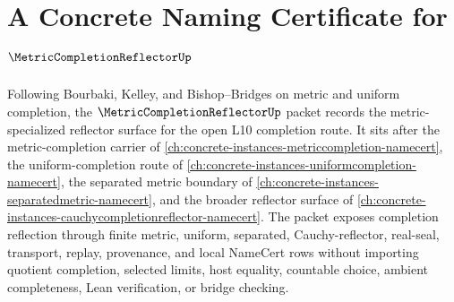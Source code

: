 \chapter{A Concrete Naming Certificate for $\MetricCompletionReflectorUp$}
\label{ch:concrete-instances-metric-completion-reflector-namecert}

Following Bourbaki, Kelley, and Bishop--Bridges on metric and uniform completion, the $\MetricCompletionReflectorUp$ packet records the metric-specialized reflector surface for the open L10 completion route. It sits after the metric-completion carrier of \autoref{ch:concrete-instances-metriccompletion-namecert}, the uniform-completion route of \autoref{ch:concrete-instances-uniformcompletion-namecert}, the separated metric boundary of \autoref{ch:concrete-instances-separatedmetric-namecert}, and the broader reflector surface of \autoref{ch:concrete-instances-cauchycompletionreflector-namecert}. The packet exposes completion reflection through finite metric, uniform, separated, Cauchy-reflector, real-seal, transport, replay, provenance, and local NameCert rows without importing quotient completion, selected limits, host equality, countable choice, ambient completeness, Lean verification, or bridge checking.

